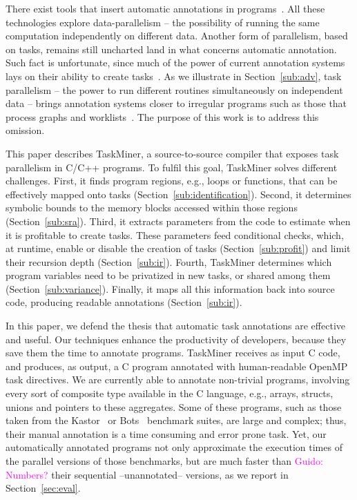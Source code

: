 \documentclass[sigplan,10pt,review,anonymous]{acmart}
\newcommand{\guido}[1]{\noindent\textcolor{magenta}{Guido: {#1}}}
\newcommand{\guido}[1]{}
\newcommand\Taskminer{\mbox{\textsf{TaskMiner}}}
\begin{document}
There exist tools that insert automatic annotations in
programs~\cite{Amini12,Guelton12,Mendonca16,Pingali11,Nugteren14}.
All these technologies explore data-parallelism -- the possibility of running
the same computation independently on different data.
Another form of parallelism, based on tasks, remains still uncharted land in what
concerns automatic annotation.
Such fact is unfortunate, since much of the power of current annotation
systems lays on their ability to create tasks~\cite{Ayguade09}.
As we illustrate in Section~\ref{sub:adv}, task parallelism -- the power to run
different routines simultaneously on independent data -- brings annotation systems
closer to irregular programs such as those that process graphs and
worklists~\cite{Ben-Nun17,Kulkarni11,Pingali11}.
The purpose of this work is to address this omission.

This paper describes \Taskminer, a source-to-source compiler that exposes task
parallelism in C/C++ programs.
To fulfil this goal, \Taskminer{} solves different challenges.
First, it finds program regions, e.g., loops or functions, that can be
effectively mapped onto tasks (Section~\ref{sub:identification}).
Second, it determines symbolic bounds to the memory blocks accessed within
those regions (Section~\ref{sub:sra}).
Third, it extracts parameters from the code to estimate when it is profitable to
create tasks.
These parameters feed conditional checks, which, at runtime, enable or disable
the creation of tasks (Section~\ref{sub:profit}) and limit their recursion
depth (Section~\ref{sub:ir}).
Fourth, \Taskminer{} determines which program variables need to be 
privatized in new tasks, or shared among them (Section~\ref{sub:variance}).
Finally, it maps all this information back into source code, producing
readable annotations (Section~\ref{sub:ir}).

In this paper, we defend the thesis that automatic task annotations are
effective and useful.
Our techniques enhance the productivity of developers, because they save them
the time to annotate programs.
\Taskminer{} receives as input C code, and produces, as output, a C
program annotated with human-readable OpenMP task directives.
We are currently able to annotate non-trivial programs, involving every
sort of composite type available in the C language, e.g., arrays, structs,
unions and pointers to these aggregates.
Some of these programs, such as those taken from the
Kastor~\cite{Virouleau14} or Bots~\cite{Duran09}
benchmark suites, are large and complex; thus, their manual annotation is a
time consuming and error prone task.
Yet, our automatically annotated programs not only approximate the execution
times of the parallel versions of those benchmarks, but are much faster than
\guido{Numbers?}
their sequential --unannotated-- versions, as we report in Section~\ref{sec:eval}.
\end{document}
